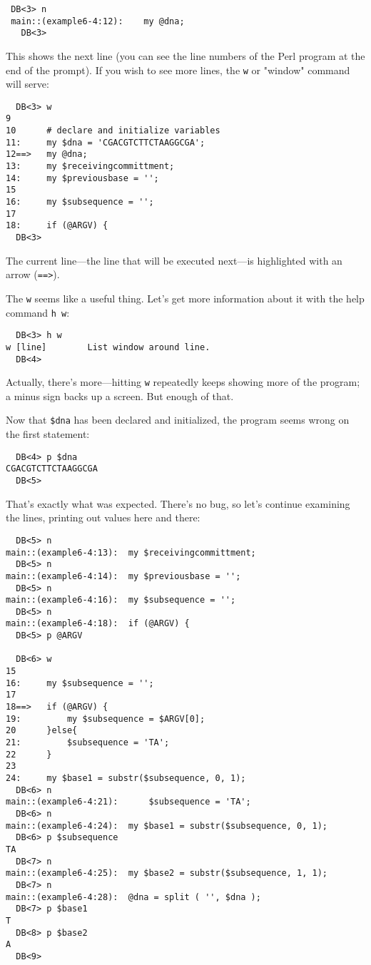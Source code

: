 \begin{lstlisting}
 DB<3> n
 main::(example6-4:12):    my @dna;
   DB<3> 
\end{lstlisting}

This shows the next line (you can see the line numbers of the Perl program at the end of the prompt). If you wish to see more lines, the \verb|w| or "window" command will serve: 

\begin{lstlisting}
  DB<3> w
9
10      # declare and initialize variables
11:     my $dna = 'CGACGTCTTCTAAGGCGA';
12==>   my @dna;
13:     my $receivingcommittment;
14:     my $previousbase = ''; 
15
16:     my $subsequence = '';
17
18:     if (@ARGV) {
  DB<3>
\end{lstlisting}

The current line—the line that will be executed next—is highlighted with an arrow (\verb|==>|).

The \verb|w| seems like a useful thing. Let's get more information about it with the help command \verb|h w|: 

\begin{lstlisting}
  DB<3> h w
w [line]        List window around line.
  DB<4> 
\end{lstlisting}

Actually, there's more—hitting \verb|w| repeatedly keeps showing more of the program; a minus sign backs up a screen. But enough of that.

Now that \verb|$dna| has been declared and initialized, the program seems wrong on the first statement: 

\begin{lstlisting}
  DB<4> p $dna
CGACGTCTTCTAAGGCGA
  DB<5> 
\end{lstlisting}

That's exactly what was expected. There's no bug, so let's continue examining the lines, printing out values here and there: 

\begin{lstlisting}
  DB<5> n
main::(example6-4:13):	my $receivingcommittment;
  DB<5> n
main::(example6-4:14):	my $previousbase = ''; 
  DB<5> n
main::(example6-4:16):	my $subsequence = '';
  DB<5> n
main::(example6-4:18):	if (@ARGV) {
  DB<5> p @ARGV

  DB<6> w
15
16:     my $subsequence = '';
17
18==>   if (@ARGV) {
19:         my $subsequence = $ARGV[0];
20      }else{
21:         $subsequence = 'TA';
22      }
23
24:     my $base1 = substr($subsequence, 0, 1);
  DB<6> n
main::(example6-4:21):	    $subsequence = 'TA';
  DB<6> n
main::(example6-4:24):	my $base1 = substr($subsequence, 0, 1);
  DB<6> p $subsequence
TA
  DB<7> n
main::(example6-4:25):	my $base2 = substr($subsequence, 1, 1);
  DB<7> n
main::(example6-4:28):	@dna = split ( '', $dna );
  DB<7> p $base1
T
  DB<8> p $base2
A
  DB<9>
\end{lstlisting}

